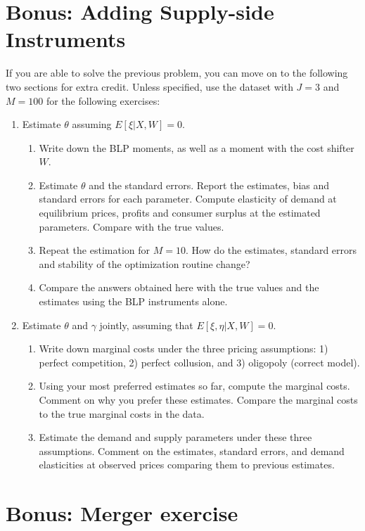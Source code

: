 \documentclass[12pt ]{article}
\begin{document}
\section{Bonus: Adding Supply-side Instruments}

If you are able to solve the previous problem, you can move on to the following two sections for extra credit. Unless specified, use the dataset with $J=3$ and $M=100$ for the
following exercises:

\begin{enumerate}
\item Estimate $\theta$ assuming $E[\xi|X,W]=0$.
  \begin{enumerate}
  \item Write down the BLP moments, as well as a moment with the cost shifter $W$.
  \item Estimate $\theta$ and the standard errors. Report the
    estimates, bias and standard errors for each parameter. Compute
    elasticity of demand at equilibrium prices, profits and consumer
    surplus at the estimated parameters. Compare with the true values.
  \item Repeat the estimation for $M=10$. How do the estimates,
    standard errors and stability of the optimization routine change?
  \item Compare the answers obtained here with the true values and the
    estimates using the BLP instruments alone.
  \end{enumerate}

\item Estimate $\theta$ and $\gamma$ jointly, assuming that
  $E[\xi,\eta|X,W]=0$.
  \begin{enumerate}
  \item Write down marginal costs under the three pricing assumptions:
    1) perfect competition, 2) perfect collusion, and 3) oligopoly
    (correct model).
  \item Using your most preferred estimates so far, compute the
    marginal costs. Comment on why you prefer these estimates. Compare
    the marginal costs to the true marginal costs in the data.
  \item Estimate the demand and supply parameters under these three
    assumptions. Comment on the estimates, standard errors, and demand
    elasticities at observed prices comparing them to previous
    estimates.
  \end{enumerate}
\end{enumerate}

\section{Bonus: Merger exercise}
\end{document}
